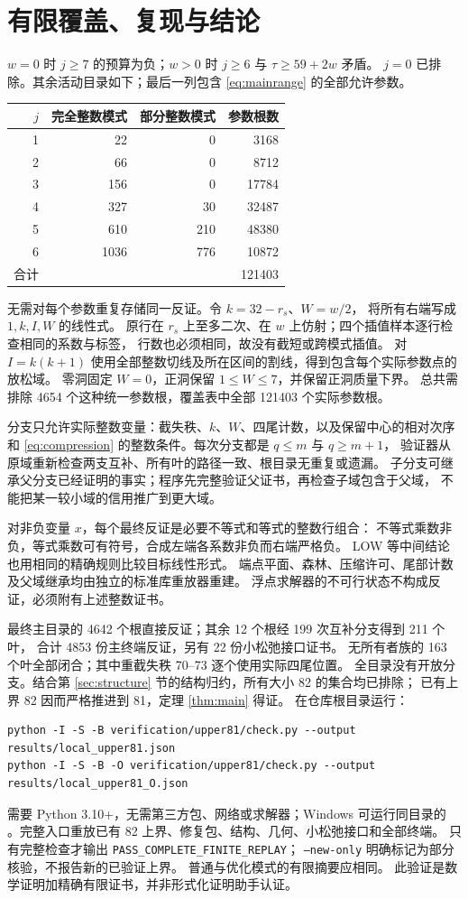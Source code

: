 \documentclass[11pt,a4paper]{article}
\begin{document}
\section{有限覆盖、复现与结论}\label{sec:finite}
$w=0$ 时 $j\ge7$ 的预算为负；$w>0$ 时 $j\ge6$ 与 $\tau\ge59+2w$ 矛盾。
$j=0$ 已排除。其余活动目录如下；最后一列包含 \eqref{eq:mainrange} 的全部允许参数。
\begin{center}\begin{tabular}{rrrr}\toprule
$j$ & 完全整数模式 & 部分整数模式 & 参数根数\\\midrule
1&22&0&3168\\2&66&0&8712\\3&156&0&17784\\
4&327&30&32487\\5&610&210&48380\\6&1036&776&10872\\\midrule
合计&&&121403\\\bottomrule\end{tabular}\end{center}

无需对每个参数重复存储同一反证。令 $k=32-r_s$、$W=w/2$，
将所有右端写成 $1,k,I,W$ 的线性式。
原行在 $r_s$ 上至多二次、在 $w$ 上仿射；四个插值样本逐行检查相同的系数与标签，
行数也必须相同，故没有截短或跨模式插值。
对 $I=k(k+1)$ 使用全部整数切线及所在区间的割线，得到包含每个实际参数点的放松域。
零洞固定 $W=0$，正洞保留 $1\le W\le7$，并保留正洞质量下界。
总共需排除 4654 个这种统一参数根，覆盖表中全部 121403 个实际参数根。

分支只允许实际整数变量：截失秩、$k$、$W$、四尾计数，以及保留中心的相对次序
和 \eqref{eq:compression} 的整数条件。每次分支都是 $q\le m$ 与 $q\ge m+1$，
验证器从原域重新检查两支互补、所有叶的路径一致、根目录无重复或遗漏。
子分支可继承父分支已经证明的事实；程序先完整验证父证书，再检查子域包含于父域，
不能把某一较小域的信用推广到更大域。

对非负变量 $x$，每个最终反证是必要不等式和等式的整数行组合：
不等式乘数非负，等式乘数可有符号，合成左端各系数非负而右端严格负。
LOW 等中间结论也用相同的精确规则比较目标线性形式。
端点平面、森林、压缩许可、尾部计数及父域继承均由独立的标准库重放器重建。
浮点求解器的不可行状态不构成反证，必须附有上述整数证书。

最终主目录的 4642 个根直接反证；其余 12 个根经 199 次互补分支得到 211 个叶，
合计 4853 份主终端反证，另有 22 份小松弛接口证书。
无所有者族的 163 个叶全部闭合；其中重截失秩 70--73 逐个使用实际四尾位置。
全目录没有开放分支。结合第 \ref{sec:structure} 节的结构归约，所有大小 82 的集合均已排除；
已有上界 82 因而严格推进到 81，定理 \ref{thm:main} 得证。
在仓库根目录运行：
\begin{verbatim}
python -I -S -B verification/upper81/check.py --output results/local_upper81.json
python -I -S -B -O verification/upper81/check.py --output results/local_upper81_O.json
\end{verbatim}
需要 Python 3.10+，无需第三方包、网络或求解器；Windows 可运行同目录的
。完整入口重放已有 82 上界、修复包、结构、几何、小松弛接口和全部终端。
只有完整检查才输出 \texttt{PASS\_COMPLETE\_FINITE\_REPLAY}；
\texttt{--new-only} 明确标记为部分核验，不报告新的已验证上界。
普通与优化模式的有限摘要应相同。
此验证是数学证明加精确有限证书，并非形式化证明助手认证。
\end{document}
